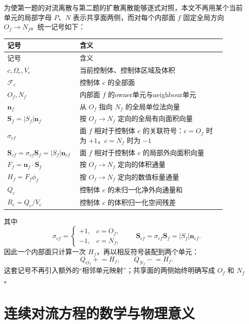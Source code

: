 \documentclass[UTF8,12pt,a4paper,fontset=fandol]{ctexart}
\numberwithin{equation}{section}
\newcommand{\Sf}{\bm S}
\begin{document}
为使第一题的对流离散与第二题的扩散离散能够逐式对照，本文不再用某个当前
单元的局部字母 $P$、$N$ 表示共享面两侧，而对每个内部面 $f$ 固定全局方向
$O_f\to N_f$。统一记号如下：
\begin{longtable}{L{0.25\linewidth}L{0.64\linewidth}}
\toprule
记号 & 含义\\
\midrule
\endfirsthead
\toprule
记号 & 含义\\
\midrule
\endhead
$c,\Omega_c,V_c$ & 当前控制体、控制体区域及体积\\
$\mathcal F_c$ & 控制体 $c$ 的全部面\\
$O_f,N_f$ & 内部面 $f$ 的owner单元与neighbour单元\\
$\bm n_f$ & 从 $O_f$ 指向 $N_f$ 的全局单位法向量\\
$\Sf_f=|S_f|\bm n_f$ & 按 $O_f\to N_f$ 定向的全局有向面积向量\\
$\sigma_{cf}$ & 面 $f$ 相对于控制体 $c$ 的关联符号：$c=O_f$ 时为 $+1$，$c=N_f$ 时为 $-1$\\
$\Sf_{cf}=\sigma_{cf}\Sf_f=|S_f|\bm n_{cf}$ & 面 $f$ 相对于控制体 $c$ 的局部外向面积向量\\
$F_f=\bm u_f\cdot\Sf_f$ & 按 $O_f\to N_f$ 定向的体积通量\\
$H_f=F_f\phi_f$ & 按 $O_f\to N_f$ 定向的数值标量通量\\
$Q_c$ & 控制体 $c$ 的未归一化净外向通量和\\
$R_c=Q_c/V_c$ & 控制体 $c$ 的体积归一化空间残差\\
\bottomrule
\end{longtable}

其中
\begin{equation}
  \boxed{
  \sigma_{cf}=
  \begin{cases}
    +1,&c=O_f,\\
    -1,&c=N_f,
  \end{cases}
  \qquad
  \Sf_{cf}=\sigma_{cf}\Sf_f=|S_f|\bm n_{cf}.}
  \label{eq:unified_orientation}
\end{equation}
因此一个内部面只计算一次 $H_f$，再以相反符号装配到两个单元：
\begin{equation}
  Q_{O_f}\mathrel{+}=H_f,
  \qquad
  Q_{N_f}\mathrel{-}=H_f.
  \label{eq:unified_face_assembly_intro}
\end{equation}
这套记号不再引入额外的“相邻单元映射”；共享面的两侧始终明确写成
$O_f$ 和 $N_f$。

\section{连续对流方程的数学与物理意义}
\end{document}
